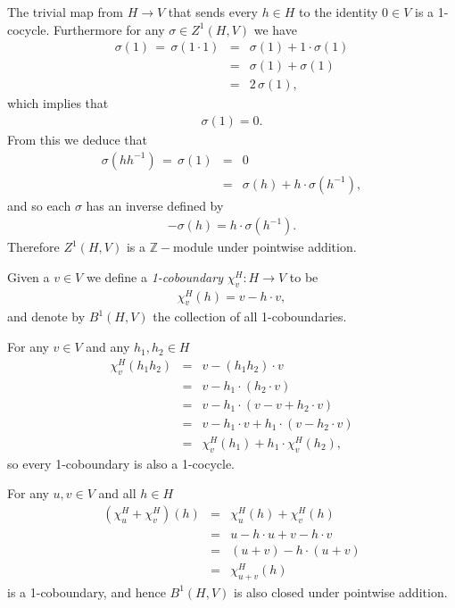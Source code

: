 The trivial map from $H \rightarrow V$ that sends every $h \in H$ to the identity $0 \in V$ is a 1-cocycle. Furthermore for any $\sigma \in Z^1(H, V)$ we have
\begin{eqnarray*}
	\sigma(1)\, =\, \sigma(1\cdot 1) &=& \sigma(1) + 1\cdot \sigma(1) \\
	&=& \sigma(1) + \sigma(1) \\
	&=& 2\,\sigma(1),
\end{eqnarray*}
which implies that
\begin{eqnarray*}
\sigma(1) = 0.
\end{eqnarray*}
From this we deduce that
\begin{eqnarray*}
	\sigma(hh^{-1})\, =\, \sigma(1) &=& 0 \\
	&=& \sigma(h) + h\cdot \sigma(h^{-1}),
\end{eqnarray*}
and so each $\sigma$ has an inverse defined by
\begin{eqnarray*}
	-\sigma(h) = h\cdot\sigma(h^{-1}).
\end{eqnarray*}
Therefore $Z^1\left(H, V\right)$ is a $\mathbb{Z}-$module under pointwise addition.

Given a $v \in V$ we define a \emph{1-coboundary} $\chi^H_v:H\rightarrow V$ to be
\begin{eqnarray*}
	\chi^H_v (h) = v - h\cdot v,
\end{eqnarray*}
and denote by $B^1\left(H, V\right)$ the collection of all 1-coboundaries. 

For any $v \in V$ and any $h_1, h_2 \in H$
\begin{eqnarray*}
	\chi^H_v(h_1h_2) &=& v - (h_1h_2)\cdot v \\
	&=& v - h_1 \cdot \left(h_2\cdot v \right)\\
	&=& v - h_1 \cdot \left(v -v + h_2\cdot v \right)\\
	&=& v - h_1\cdot v + h_1\cdot \left( v - h_2\cdot v\right)\\
	&=& \chi^H_v(h_1) + h_1\cdot \chi^H_v(h_2),
\end{eqnarray*}
so every 1-coboundary is also a 1-cocycle. 

For any $u,v \in V$ and all $h \in H$
\begin{eqnarray*}
	(\chi^H_u + \chi^H_v)(h) &=& \chi^H_u(h) + \chi^H_v(h)\\
	&=& u - h\cdot u + v - h\cdot v \\
	&=& (u + v) - h\cdot (u + v) \\
	&=& \chi^H_{u + v} (h)
\end{eqnarray*}
is a 1-coboundary, and hence $B^1\left(H, V\right)$ is also closed under pointwise addition.

